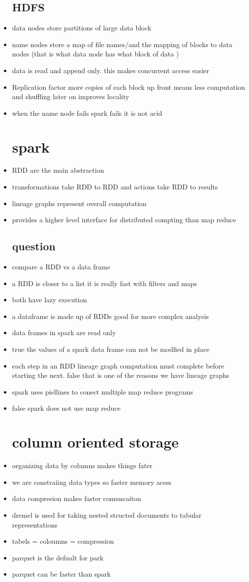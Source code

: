 \documentclass{article}
\begin{document}
\begin{itemize}
\subsection*{HDFS}
\item data nodes store partitions of large data block 
\item name nodes store a map of file names/and the mapping of blocks to data nodes (that is what data node has what block of data )
\item data is read and append only. this makes concurrent access easier 
\item Replication factor more copies of each block up front means less computation and shuffling later on improves locality
\item when the name  node fails spark fails it is not acid
\section*{spark}
\item RDD are the main abstraction 
\item transformations take RDD to RDD and actions take RDD to results 
\item lineage graphs represent overall computation
\item provides a higher level interface for distributed compting than map reduce 
\subsection*{question }
\item compare a RDD vs a data frame 
\item a RDD is closer to a list it is really fast with filters and maps 
\item both have lazy execution 
\item a dataframe is made up of RDDs good for more complex analysis
\item data frames in spark are read only 
\item true the values of a spark data frame can not be modfied in place
\item each step in an RDD lineage graph computation must complete before starting the next. false that is one of the reasons we have lineage graphs 
\item spark uses piellines to conect multiple map reduce programs 
\item false spark does not use map reduce 
\section*{column oriented storage}
\item organizing data by columns makes things fater 
\item we are constraiing data types so faster memory acess 
\item data compresion makes faster comuncaiton 
\item dremel is used for taking nested structed documents to tabular representations 
\item tabels = coloumns = compression 
\item parquet is the defualt for park 
\item parquet can be faster than spark 

\end{itemize}
\end{document}
